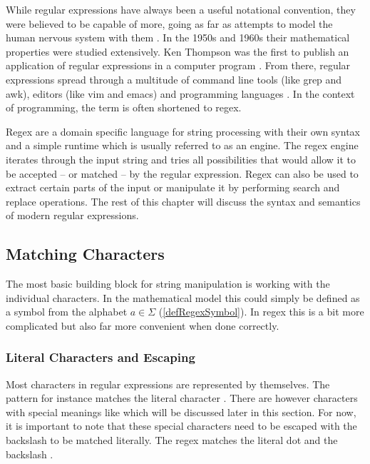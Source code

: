 While regular expressions have always been a useful notational convention, they were believed to be capable of more, going as far as attempts to model the human nervous system with them \cite[p.~85~ff]{MasteringRegex}. In the 1950s and 1960s their mathematical properties were studied extensively. Ken Thompson was the first to publish an application of regular expressions in a computer program \cite{RegularExpressionSearchAlgorithm}. From there, regular expressions spread through a multitude of command line tools (like grep and awk), editors (like vim and emacs) and programming languages \cite[p.~85]{MasteringRegex}. In the context of programming, the term is often shortened to regex.

Regex are a domain specific language for string processing with their own syntax and a simple runtime which is usually referred to as an engine. The regex engine iterates through the input string and tries all possibilities that would allow it to be accepted -- or matched -- by the regular expression. Regex can also be used to extract certain parts of the input or manipulate it by performing search and replace operations. The rest of this chapter will discuss the syntax and semantics of modern regular expressions.


\subsection{Matching Characters}

The most basic building block for string manipulation is working with the individual characters. In the mathematical model this could simply be defined as a symbol from the alphabet $a \in \Sigma$ (\ref{defRegexSymbol}). In regex this is a bit more complicated but also far more convenient when done correctly.

\subsubsection{Literal Characters and Escaping}

Most characters in regular expressions are represented by themselves. The pattern  for instance matches the literal character . There are however characters with special meanings like  which will be discussed later in this section. For now, it is important to note that these special characters need to be escaped with the backslash \pattern{\bs} to be matched literally. The regex  matches the literal dot  and \pattern{\bs\bs} the backslash \inp{\bs}.

